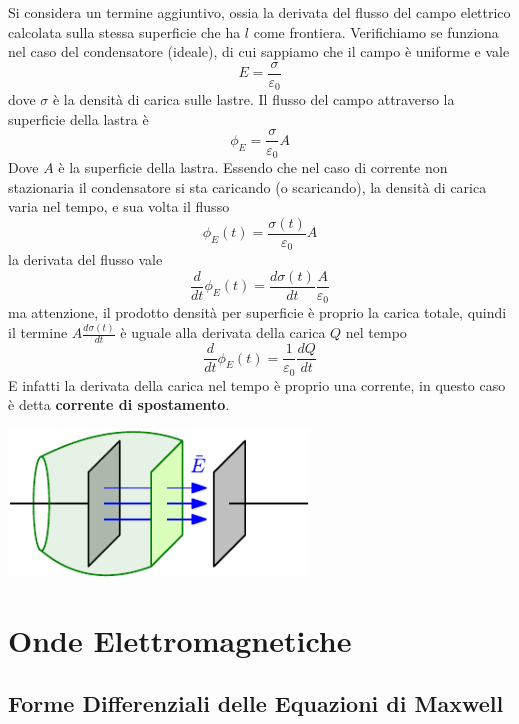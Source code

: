 \documentclass[10pt, letterpaper]{report}
\begin{document}
Si considera un termine aggiuntivo, ossia la derivata del flusso del campo elettrico calcolata sulla stessa superficie che ha $l$ come frontiera.\acc 
Verifichiamo se funziona nel caso del condensatore (ideale), di cui sappiamo che il campo è uniforme e vale $$ E=\frac{\sigma}{\varepsilon_0}$$
dove $\sigma$ è la densità di carica sulle lastre. Il flusso del campo attraverso la superficie della lastra è $$ \phi_E=\frac{\sigma}{\varepsilon_0}A$$
Dove $A$ è la superficie della lastra. Essendo che nel caso di corrente non stazionaria il condensatore si sta caricando (o scaricando), la densità di carica varia nel tempo, e sua volta il flusso 
$$ \phi_E(t)=\frac{\sigma(t)}{\varepsilon_0}A$$
la derivata del flusso vale 
$$ \frac{d}{dt}\phi_E(t)=\frac{d\sigma(t)}{dt}\frac{A}{\varepsilon_0}$$
ma attenzione, il prodotto densità per superficie è proprio la carica totale, quindi il termine $A\frac{d\sigma(t)}{dt}$ è uguale alla derivata della carica $Q$ nel tempo 
$$ \frac{d}{dt}\phi_E(t)=\frac{1}{\varepsilon_0}\frac{dQ}{dt}$$
E infatti la derivata della carica nel tempo è proprio una corrente, in questo caso è detta \textbf{corrente di spostamento}.
\begin{center}
    \includegraphics[width=0.6\textwidth]{images/ampereMaxwell.pdf}
\end{center}
\chapter{Onde Elettromagnetiche}
\section{Forme Differenziali delle Equazioni di Maxwell}
\end{document}
